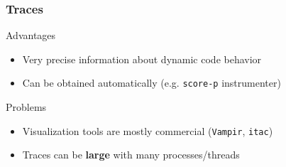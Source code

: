 \documentclass[xcolor={x11names,svgnames}]{beamer}
\begin{document}
\begin{frame}
  \frametitle{Traces}

  
  \begin{exampleblock}{Advantages}
    \begin{itemize}
    \item Very precise information about dynamic code behavior
    \item Can be obtained automatically (e.g. \texttt{score-p} instrumenter)
    \end{itemize}
  \end{exampleblock}

  
  \begin{alertblock}{Problems}
    \begin{itemize}
    \item Visualization tools are mostly commercial (\texttt{Vampir}, \texttt{itac})
    \item Traces can be \textbf{large} with many processes/threads
    \end{itemize}
  \end{alertblock}
  
\end{frame}

\end{document}
